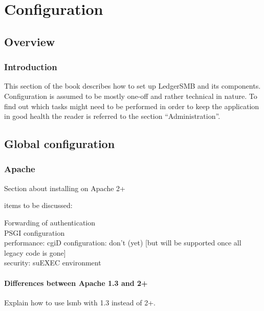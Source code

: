 

\part{Configuration}
\label{part-configuration}


\chapter{Overview}
\label{cha-configuration-overview}

\section{Introduction}
\label{sec-config-overview-introduction}
This section of the book describes how to set up LedgerSMB and its components.
Configuration is assumed to be mostly one-off and rather technical in nature.  To find
out which tasks might need to be performed in order to keep the application in good
health the reader is referred to the section ``Administration''. 

\chapter{Global configuration}
\label{cha-global-configuration}

\section{Apache}
\label{sec-global-config-apache}

Section about installing on Apache 2+

items to be discussed:

Forwarding of authentication \\
PSGI configuration \\
performance: cgiD configuration: don't (yet) [but will be supported once all legacy code is gone] \\
security: suEXEC environment \\

\subsection{Differences between Apache 1.3 and 2+}
\label{subsec-global-config-apache-13-vs-2}

Explain how to use lsmb with 1.3 instead of 2+.

